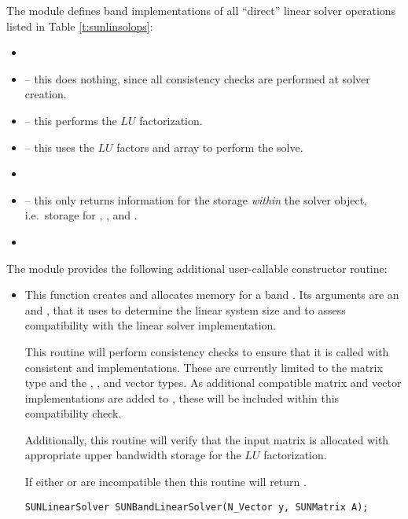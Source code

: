 
\noindent The {\sunlinsolband} module defines band implementations of all
``direct'' linear solver operations listed in
Table \ref{t:sunlinsolops}:
\begin{itemize}
\item {}
\item {} -- this does nothing, since all
  consistency checks are performed at solver creation.
\item {} -- this performs the $LU$ factorization.
\item {} -- this uses the $LU$ factors
  and  array to perform the solve.
\item {}
\item {} -- this only returns information for
  the storage \emph{within} the solver object, i.e.~storage
  for , , and .
\item {}
\end{itemize}
The module {\sunlinsolband} provides the following additional
user-callable constructor routine: 
\begin{itemize}


\item {}

  This function creates and allocates memory for a band .
  Its arguments are an {\nvector} and {\sunmatrix}, that it uses to
  determine the linear system size and to assess compatibility with
  the linear solver implementation.

  This routine will perform consistency checks to ensure that it is
  called with consistent {\nvector} and {\sunmatrix} implementations.
  These are currently limited to the {\sunmatband} matrix type and
  the {\nvecs}, {\nvecopenmp}, and {\nvecpthreads} vector types.  As
  additional compatible matrix and vector implementations are added to
  {\sundials}, these will be included within this compatibility check.

  Additionally, this routine will verify that the input matrix 
  is allocated with appropriate upper bandwidth storage for the $LU$
  factorization.

  If either  or  are incompatible then this routine will
  return .

  \verb|SUNLinearSolver SUNBandLinearSolver(N_Vector y, SUNMatrix A);|

\end{itemize}
